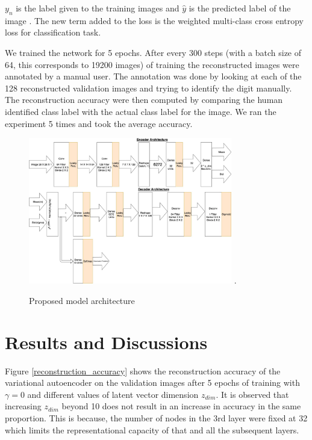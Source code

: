 \documentclass{uai2021} %
\begin{document}
$y_n$ is the label given to the training images and $\hat{y}$ is the predicted label of the image . The new term added to the loss is the weighted multi-class cross entropy loss for classification task.

We trained the network for 5 epochs.
After every 300 steps (with a batch size of 64, this corresponds to 19200 images) of training the reconstructed images were annotated by a manual user. The annotation was done by looking at each of the 128  reconstructed validation images and trying to identify the digit manually.
The reconstruction accuracy were then computed by comparing the human identified class label with the actual class label for the image. We ran the experiment 5 times and took the average accuracy.


\begin{figure}[!t]
\centering
\includegraphics[width=3.5in]{vae_model_architecture_classification.jpg}
\DeclareGraphicsExtensions.
\caption{Proposed model architecture}
\label{vae_architecture}
\end{figure}

\section{Results and Discussions} \label{results}
Figure \ref{reconstruction_accuracy} shows  the reconstruction accuracy of the variational autoencoder on the validation images after 5 epochs of training with $\gamma = 0$  and different values of latent vector dimension $z_{dim}$. It is observed that increasing $z_{dim}$ beyond 10 does not result in an increase in accuracy in the same proportion. This is because, the number of nodes in the 3rd layer were fixed at 32 which limits the representational capacity of that and all the subsequent layers.
\end{document}
